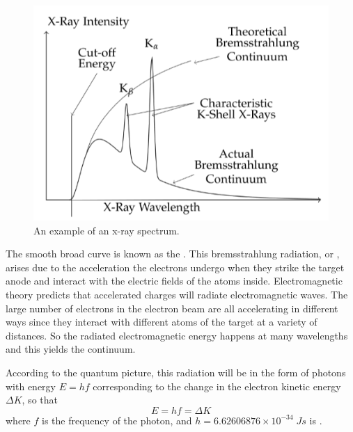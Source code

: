 \begin{figure}[H]
    \centering
    \includegraphics[scale = 0.8]{Images/XR4.PNG}
    \caption{An example of an x-ray spectrum.}
    \label{fig:XR4}
\end{figure}

\noindent The smooth broad curve is known as the . This bremsstrahlung radiation, or , arises due to the acceleration the electrons undergo when they strike the target anode and interact with the electric fields of the atoms inside. Electromagnetic theory predicts that accelerated charges will radiate electromagnetic waves. The large number of electrons in the electron beam are all accelerating in different ways since they interact with different atoms of the target at a variety of distances. So the radiated electromagnetic energy happens at many wavelengths and this yields the continuum.

\noindent According to the quantum picture, this radiation will be in the form of photons with energy $E = hf$ corresponding to the change in the electron kinetic energy $\Delta K$, so that \begin{equation}\label{eq:XR1}
    E = hf = \Delta K
\end{equation}
where $f$ is the frequency of the photon, and $h = 6.62606876\times 10^{-34}\;Js$ is .

